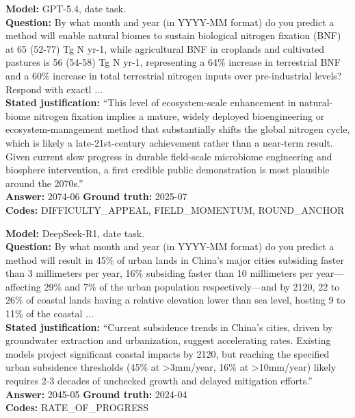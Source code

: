 \begin{tcolorbox}[title={Box 1. Round-year anchoring on the temporal task}]
\textbf{Model:} GPT-5.4, date task.\\
\textbf{Question:} By what month and year (in YYYY-MM format) do you predict a method will enable natural biomes to sustain biological nitrogen fixation (BNF) at 65 (52-77) Tg N yr-1, while agricultural BNF in croplands and cultivated pastures is 56 (54-58) Tg N yr-1, representing a 64\% increase in terrestrial BNF and a 60\% increase in total terrestrial nitrogen inputs over pre-industrial levels? Respond with exactl ...\\
\textbf{Stated justification:} ``This level of ecosystem-scale enhancement in natural-biome nitrogen fixation implies a mature, widely deployed bioengineering or ecosystem-management method that substantially shifts the global nitrogen cycle, which is likely a late-21st-century achievement rather than a near-term result. Given current slow progress in durable field-scale microbiome engineering and biosphere intervention, a first credible public demonstration is most plausible around the 2070s.''\\
\textbf{Answer:} 2074-06 \quad \textbf{Ground truth:} 2025-07\\
\textbf{Codes:} DIFFICULTY_APPEAL, FIELD_MOMENTUM, ROUND_ANCHOR
\end{tcolorbox}

\begin{tcolorbox}[title={Box 2. A derived rate of progress, still far too slow}]
\textbf{Model:} DeepSeek-R1, date task.\\
\textbf{Question:} By what month and year (in YYYY-MM format) do you predict a method will result in 45\% of urban lands in China's major cities subsiding faster than 3 millimeters per year, 16\% subsiding faster than 10 millimeters per year—affecting 29\% and 7\% of the urban population respectively—and by 2120, 22 to 26\% of coastal lands having a relative elevation lower than sea level, hosting 9 to 11\% of the coastal ...\\
\textbf{Stated justification:} ``Current subsidence trends in China's cities, driven by groundwater extraction and urbanization, suggest accelerating rates. Existing models project significant coastal impacts by 2120, but reaching the specified urban subsidence thresholds (45\% at >3mm/year, 16\% at >10mm/year) likely requires 2-3 decades of unchecked growth and delayed mitigation efforts.''\\
\textbf{Answer:} 2045-05 \quad \textbf{Ground truth:} 2024-04\\
\textbf{Codes:} RATE_OF_PROGRESS
\end{tcolorbox}

